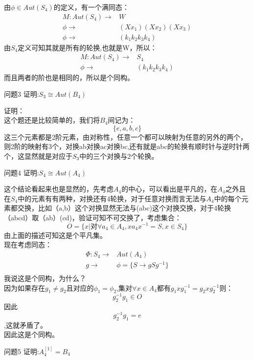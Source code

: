 \documentclass[utf8]{ctexart}
\begin{document}
由$\phi\in Aut(S_{4})$的定义，有一个满同态：
\begin{align*}
	M: Aut(S_{4})\rightarrow &W \\
	\phi\rightarrow &(Xx_{1})(Xx_{2})(Xx_{3})\\
	\phi\rightarrow &(k_{1}k_{2}k_{3}k_{4})
	\end{align*}
	由$S_{4}$定义可知其就是所有的轮换,也就是W，所以：
	\begin{align*}
	M: Aut(S_{4})\rightarrow &S_{4} \\
	\phi\rightarrow &(k_{1}k_{2}k_{3}k_{4})
	\end{align*}
而且两者的阶也是相同的，所以是个同构。
\begin{mybox}[colback=white]{问题3}
证明:$ \textit{S}_{3} \cong Aut(\textit{B}_{4}) $
\end{mybox}
\noindent
证明：\\
这个题还是比较简单的，我们将$B_{4}$间记为：
$$\{e,a,b,c\}$$这三个元素都是2阶元素，由对称性，任意一个都可以映射为任意的另外的两个，则2阶的映射有3个，对换ab对换ac对换bc,还有就是abc的轮换有顺时针与逆时针两个，这显然就是对应于$S_{3}$中的三个对换与2个轮换。
\begin{mybox}[colback=white]{问题4}
证明:$ \textit{S}_{4} \cong Aut(\textit{A}_{4}) $
\end{mybox}
这个结论看起来也是显然的，先考虑$A_{4}$的中心，可以看出是平凡的，在$A_{4}$之外且在$S_{4}$中的元素有有两种，对换还有4轮换，对于任意对换而言无法与$A_{4}$中的每个元素都交换，比如（a,b）这个对换显然无法与(abc)这个对换交换，对于4轮换（abcd）取（ab）(cd)，验证可知不可交换了，考虑集合：
$$O=\{x|对\forall a_{4}\in A_{4},xa_{4}x^{-1}=S,x\in S_{4}\}$$由上面的描述可知这是个平凡集。\\
现在考虑同态：
\begin{align*}
	\Phi: S_{4}\rightarrow& Aut(A_{4}) \\
	g\rightarrow& \phi =\{S\rightarrow gSg^{-1}\}\\
	\end{align*}
	我说这是个同构，为什么？\\
	因为如果存在$g_{1} \not= g_{2}$且对应的$\phi_{1}=\phi_{2}$,集对$\forall x\in A_{4}$都有$g_{1}x g_{1}^{-1}=g_{2}xg_{2}^{-1}$则：$$g_{2}^{-1}g_{1}\in O$$
	因此$$g_{2}^{-1}g_{1}=e$$,这就矛盾了。\\因此这是个同构。
\begin{mybox}[colback=white]{问题5}
证明:$ A_{4}^{[1]}=B_{4} $
\end{mybox}
\end{document}

